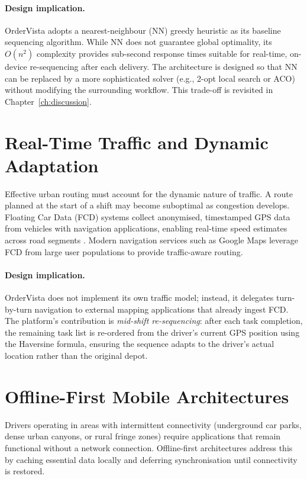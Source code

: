 \paragraph{Design implication.}
OrderVista adopts a nearest-neighbour (NN) greedy heuristic as its baseline sequencing algorithm. While NN does not guarantee global optimality, its $O(n^{2})$ complexity provides sub-second response times suitable for real-time, on-device re-sequencing after each delivery. The architecture is designed so that NN can be replaced by a more sophisticated solver (e.g., 2-opt local search or ACO) without modifying the surrounding workflow. This trade-off is revisited in Chapter~\ref{ch:discussion}.

\section{Real-Time Traffic and Dynamic Adaptation}
\label{sec:lit-traffic}

Effective urban routing must account for the dynamic nature of traffic. A route planned at the start of a shift may become suboptimal as congestion develops. Floating Car Data (FCD) systems collect anonymised, timestamped GPS data from vehicles with navigation applications, enabling real-time speed estimates across road segments \autocite{herrera2010evaluation}. Modern navigation services such as Google Maps leverage FCD from large user populations to provide traffic-aware routing.

\paragraph{Design implication.}
OrderVista does not implement its own traffic model; instead, it delegates turn-by-turn navigation to external mapping applications that already ingest FCD. The platform's contribution is \emph{mid-shift re-sequencing}: after each task completion, the remaining task list is re-ordered from the driver's current GPS position using the Haversine formula, ensuring the sequence adapts to the driver's actual location rather than the original depot.

\section{Offline-First Mobile Architectures}
\label{sec:lit-offline}

Drivers operating in areas with intermittent connectivity (underground car parks, dense urban canyons, or rural fringe zones) require applications that remain functional without a network connection. Offline-first architectures address this by caching essential data locally and deferring synchronisation until connectivity is restored.


